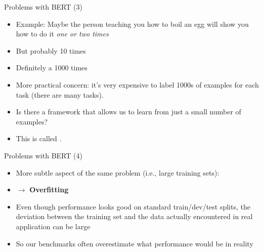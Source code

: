
\begin{frame}{Problems with BERT (3)}

\vfill

  \begin{itemize}
\item Example: Maybe the person teaching you how to boil an egg will show you how to do it \textit{one or two times}
\item But probably  10 times
\item Definitely  a 1000 times 
\item More practical concern: it's very expensive to label 1000s of examples for each task (there are many tasks).
\item \ques Is there a framework that allows us to learn from just a small number of examples?
\item This is called .
    \end{itemize}

\vfill

\end{frame}


\begin{frame}{Problems with BERT (4)}

\vfill

  \begin{itemize}
		\item More subtle aspect of the same problem (i.e., large training sets):
		\item[] $\to$ \textbf{Overfitting}
		\item Even though performance looks good on standard train/dev/test splits, the deviation between the training set and the
data actually encountered in real application can be large
		\item So our benchmarks often overestimate what performance would be in reality
  \end{itemize}

\vfill

\end{frame}


